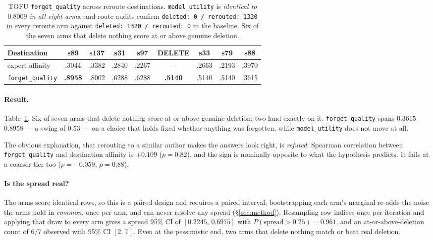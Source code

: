 \documentclass[11pt]{article}
\newcommand{\fq}{\texttt{forget\_quality}}
\newcommand{\util}{\texttt{model\_utility}}
\begin{document}
\begin{table}[t]
\centering
\small
\begin{tabular}{@{}lcccccccc@{}}
\toprule
Destination & s89 & s137 & s31 & s97 & \textbf{DELETE} & s33 & s79 & s88 \\
\midrule
expert affinity & .3044 & .3382 & .2840 & .2267 & --- & .2663 & .2193 & .3970 \\
\fq{}           & \textbf{.8958} & .8002 & .6288 & .6288 & \textbf{.5140} & .5140 & .5140 & .3615 \\
\bottomrule
\end{tabular}
\caption{TOFU \fq{} across reroute destinations. \util{} is \emph{identical to $0.8009$ in all eight
arms}, and route audits confirm \texttt{deleted:\,0 / rerouted:\,1320} in every reroute arm against
\texttt{deleted:\,1320 / rerouted:\,0} in the baseline. Six of the seven arms that delete nothing
score at or above genuine deletion.}
\label{tab:e5}
\end{table}

\paragraph{Result.} Table~\ref{tab:e5}. Six of seven arms that delete nothing score at or above
genuine deletion; two land exactly on it. \fq{} spans $0.3615$--$0.8958$ --- a swing of $0.53$ --- on
a choice that holds fixed whether anything was forgotten, while \util{} does not move at all.

The obvious explanation, that rerouting to a similar author makes the answers look right, is
\emph{refuted}: Spearman correlation between \fq{} and destination affinity is $+0.109$ ($p=0.82$),
and the sign is nominally opposite to what the hypothesis predicts. It fails at a coarser tier too
($\rho = -0.059$, $p = 0.88$).

\paragraph{Is the spread real?} The arms score identical rows, so this is a paired design and
requires a paired interval; bootstrapping each arm's marginal re-adds the noise the arms hold in
\emph{common}, once per arm, and can never resolve any spread (\S\ref{sec:method}). Resampling row
indices once per iteration and applying that draw to every arm gives a spread 95\% CI of
$[0.2245,\,0.6975]$ with $P(\text{spread} > 0.25) = 0.961$, and an at-or-above-deletion count of
$6/7$ observed with 95\% CI $[2,\,7]$. Even at the pessimistic end, two arms that delete nothing
match or beat real deletion.
\end{document}
